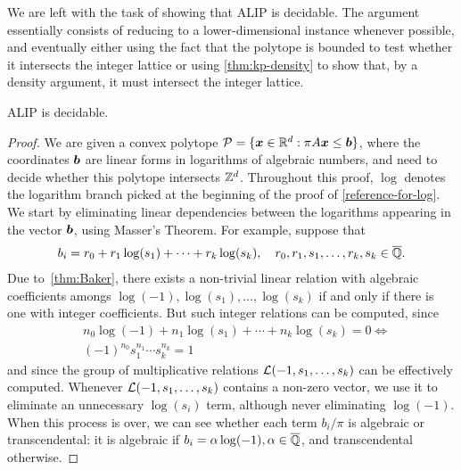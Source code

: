 We are left with the task of showing that ALIP is decidable. The argument essentially consists of reducing to a lower-dimensional instance whenever possible, and eventually either using the fact that the polytope is bounded to test whether it intersects the integer lattice or using \cref{thm:kp-density} to show that, by a density argument, it must intersect the integer lattice.

\begin{theorem}
ALIP is decidable.
\end{theorem}

\begin{proof}
We are given a convex polytope $\mathcal{P}=\lbrace \boldsymbol{x} \in \mathbb{R}^{d} : \pi A \boldsymbol{x} \leq \boldsymbol{b} \rbrace$, where the coordinates $\boldsymbol{b}$ are linear forms in logarithms of algebraic numbers, and need to decide whether this polytope intersects $\mathbb{Z}^{d}$. Throughout this proof, $\log$ denotes the logarithm branch picked at the beginning of the proof of \cref{reference-for-log}.
We start by eliminating linear dependencies between the logarithms appearing in the vector $\boldsymbol{b}$, using Masser's Theorem.
For example, suppose that
\begin{align*}
b_{i} = r_{0} + r_{1} \log(s_{1}) + \cdots + r_{k} \log(s_{k}), \quad r_{0}, r_{1}, s_{1}, \ldots, r_{k}, s_{k} \in \overline{\mathbb{Q}}.
\end{align*}
Due to~\cref{thm:Baker}, there exists a non-trivial linear relation with algebraic coefficients amongs $\log(-1), \log(s_{1}), \ldots, \log(s_{k})$ if and only if there is one with integer coefficients. But such integer relations can be computed, since
\begin{align*}
&n_{0} \log(-1) + n_{1} \log(s_{1}) + \cdots + n_{k} \log(s_{k}) = 0 \Leftrightarrow \\
&{(-1)}^{n_{0}} s_{1}^{n_{1}} \cdots s_{k}^{n_{k}} = 1
\end{align*}
and since the group of multiplicative relations ${\mathcal{L}}(-1, s_{1}, \ldots, s_{k})$ can be effectively computed. Whenever ${\mathcal{L}}(-1, s_{1}, \ldots, s_{k})$ contains a non-zero vector, we use it to eliminate an unnecessary $\log(s_{i})$ term, although never eliminating $\log(-1)$. When this process is over, we can see whether each term $b_{i}/\pi$ is algebraic or transcendental: it is algebraic if $b_{i} = \alpha \log(-1), \alpha \in \overline{\mathbb{Q}}$, and transcendental otherwise.


\end{proof}
